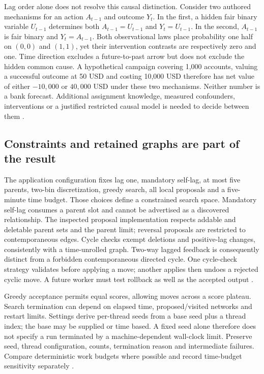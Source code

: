 Lag order alone does not resolve this causal distinction. Consider two
authored mechanisms for an action $A_{t-1}$ and outcome $Y_t$. In the first,
a hidden fair binary variable $U_{t-1}$ determines both
$A_{t-1}=U_{t-1}$ and $Y_t=U_{t-1}$. In the second,
$A_{t-1}$ is fair binary and $Y_t=A_{t-1}$. Both observational laws place
probability one half on $(0,0)$ and $(1,1)$, yet their intervention contrasts
are respectively zero and one. Time direction excludes a future-to-past
arrow but does not exclude the hidden common cause. A hypothetical campaign
covering 1,000 accounts, valuing a successful outcome at 50 USD and costing
10,000 USD therefore has net value of either $-10{,}000$ or $40{,}000$ USD
under these two mechanisms. Neither number is a bank forecast. Additional
assignment knowledge, measured confounders, interventions or a justified
restricted causal model is needed to decide between them
\citep{exec24_banjo_choice}.

\subsection{Constraints and retained graphs are part of the result}
The application configuration fixes lag one, mandatory self-lag, at most five
parents, two-bin discretization, greedy search, all local proposals and a
five-minute time budget. Those choices define a constrained search space.
Mandatory self-lag consumes a parent slot and cannot be advertised as a
discovered relationship. The inspected proposal implementation respects
addable and deletable parent sets and the parent limit; reversal proposals
are restricted to contemporaneous edges. Cycle checks exempt deletions and
positive-lag changes, consistently with a time-unrolled graph. Two-way lagged
feedback is consequently distinct from a forbidden contemporaneous directed
cycle. One cycle-check strategy validates before applying a move; another
applies then undoes a rejected cyclic move. A future worker must test rollback
as well as the accepted output \citep{exec24_banjo_source}.

Greedy acceptance permits equal scores, allowing moves across a score
plateau. Search termination can depend on elapsed time, proposed/visited
networks and restart limits. Settings derive per-thread seeds from a base
seed plus a thread index; the base may be supplied or time based. A fixed
seed alone therefore does not specify a run terminated by a machine-dependent
wall-clock limit. Preserve seed, thread configuration, counts, termination
reason and intermediate failures. Compare deterministic work budgets where
possible and record time-budget sensitivity separately
\citep{exec24_banjo_source}.

